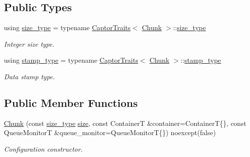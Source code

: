 \subsection*{Public Types}
\begin{DoxyCompactItemize}
\item 
\mbox{\label{classflow_1_1driver_1_1_chunk_ae04fbc608b52a2d35165e2ef95d742c3}} 
using \hyperlink{classflow_1_1driver_1_1_chunk_ae04fbc608b52a2d35165e2ef95d742c3}{size\+\_\+type} = typename \hyperlink{structflow_1_1_captor_traits}{Captor\+Traits}$<$ \hyperlink{classflow_1_1driver_1_1_chunk}{Chunk} $>$\+::\hyperlink{classflow_1_1driver_1_1_chunk_ae04fbc608b52a2d35165e2ef95d742c3}{size\+\_\+type}
\begin{DoxyCompactList}\small\item\em Integer size type. \end{DoxyCompactList}\item 
\mbox{\label{classflow_1_1driver_1_1_chunk_a6d8458f79fba18833a4893b09dd2937d}} 
using \hyperlink{classflow_1_1driver_1_1_chunk_a6d8458f79fba18833a4893b09dd2937d}{stamp\+\_\+type} = typename \hyperlink{structflow_1_1_captor_traits}{Captor\+Traits}$<$ \hyperlink{classflow_1_1driver_1_1_chunk}{Chunk} $>$\+::\hyperlink{classflow_1_1driver_1_1_chunk_a6d8458f79fba18833a4893b09dd2937d}{stamp\+\_\+type}
\begin{DoxyCompactList}\small\item\em Data stamp type. \end{DoxyCompactList}\end{DoxyCompactItemize}
\subsection*{Public Member Functions}
\begin{DoxyCompactItemize}
\item 
\hyperlink{classflow_1_1driver_1_1_chunk_a19ef6ce723c1b2922b931471b835b627}{Chunk} (const \hyperlink{classflow_1_1driver_1_1_chunk_ae04fbc608b52a2d35165e2ef95d742c3}{size\+\_\+type} \hyperlink{classflow_1_1_captor_interface_a1a4b3f7f6c1bd16a2cb672d90a1cbbc0}{size}, const ContainerT \&container=ContainerT\{\}, const Queue\+MonitorT \&queue\+\_\+monitor=Queue\+MonitorT\{\}) noexcept(false)
\begin{DoxyCompactList}\small\item\em Configuration constructor. \end{DoxyCompactList}\end{DoxyCompactItemize}
